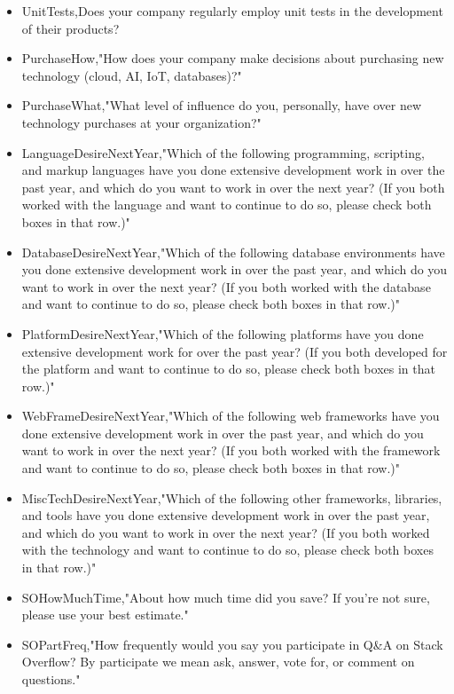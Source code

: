 \begin{appendices}
\begin{itemize}
        \item UnitTests,Does your company regularly employ unit tests in the development of their products?
        \item PurchaseHow,"How does your company make decisions about purchasing new technology (cloud, AI, IoT, databases)?"
        \item PurchaseWhat,"What level of influence do you, personally, have over new technology purchases at your organization?"
        \item LanguageDesireNextYear,"Which of the following programming, scripting, and markup languages have you done extensive development work in over the past year, and which do you want to work in over the next year?  (If you both worked with the language and want to continue to do so, please check both boxes in that row.)"
        \item DatabaseDesireNextYear,"Which of the following database environments have you done extensive development work in over the past year, and which do you want to work in over the next year?   (If you both worked with the database and want to continue to do so, please check both boxes in that row.)"
        \item PlatformDesireNextYear,"Which of the following platforms have you done extensive development work for over the past year?   (If you both developed for the platform and want to continue to do so, please check both boxes in that row.)"
        \item WebFrameDesireNextYear,"Which of the following web frameworks have you done extensive development work in over the past year, and which do you want to work in over the next year? (If you both worked with the framework and want to continue to do so, please check both boxes in that row.)"
        \item MiscTechDesireNextYear,"Which of the following other frameworks, libraries, and tools have you done extensive development work in over the past year, and which do you want to work in over the next year? (If you both worked with the technology and want to continue to do so, please check both boxes in that row.)"
        \item SOHowMuchTime,"About how much time did you save? If you're not sure, please use your best estimate."
        \item SOPartFreq,"How frequently would you say you participate in Q&A on Stack Overflow? By participate we mean ask, answer, vote for, or comment on questions."
    \end{itemize}
\end{appendices}
\thispagestyle{normal}
